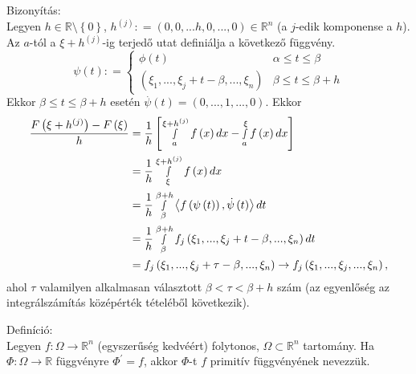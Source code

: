 \documentclass[12pt,a4paper]{scrartcl}
\newenvironment{definicio}{}{}
\newenvironment{bizonyitas}{}{}
\begin{document}
\begin{bizonyitas}

Bizonyítás:\\
Legyen \(h \in {\mathbb{R}}\text{\textbackslash}\left\{ 0 \right\}\),
\(h^{(j)}: = \left( {0,0,...h,0,...,0} \right) \in {\mathbb{R}}^{n}\) (a
\(j\)-edik komponense a \(h\)). Az \(a\)-tól a \(\xi + h^{(j)}\)-ig
terjedő utat definiálja a következő függvény.
\[\psi \left( t \right): = \left\{ {\begin{array}{*{20}{c}}
  {\phi \left( t \right)}&{\alpha  \leqslant t \leqslant \beta } \\ 
  {\left( {{\xi _1},...,{\xi _j} + t - \beta ,...,{\xi _n}} \right)}&{\beta  \leqslant t \leqslant \beta  + h} 
\end{array}} \right.\] Ekkor \(\beta \leq t \leq \beta + h\) esetén
\(\overset{.}{\psi}\left( t \right) = \left( 0,...,1,...,0 \right)\).
Ekkor \[\begin{aligned}
  \frac{{F\left( {\xi  + {h^{\left( j \right)}}} \right) - F\left( \xi  \right)}}{h} &  = \frac{1}{h}\left[ {\mathop \smallint \limits_a^{\xi  + {h^{\left( j \right)}}} f\left( x \right)dx - \mathop \smallint \limits_a^\xi  f\left( x \right)dx} \right] \\ 
   &  = \frac{1}{h}\mathop \smallint \limits_\xi ^{\xi  + {h^{\left( j \right)}}} f\left( x \right)dx \\ 
   &  = \frac{1}{h}\mathop \smallint \limits_\beta ^{\beta  + h} \left\langle {f\left( {\psi \left( t \right)} \right),\dot \psi \left( t \right)} \right\rangle dt \\ 
   &  = \frac{1}{h}\mathop \smallint \limits_\beta ^{\beta  + h} {f_j}\left( {{\xi _1},...,{\xi _j} + t - \beta ,...,{\xi _n}} \right)dt \\ 
   &  = {f_j}\left( {{\xi _1},...,{\xi _j} + \tau  - \beta ,...,{\xi _n}} \right) \to {f_j}\left( {{\xi _1},...,{\xi _j},...,{\xi _n}} \right), \\ 
\end{aligned} \] ahol \(\tau\) valamilyen alkalmasan választott
\(\beta < \tau < \beta + h\) szám (az egyenlőség az integrálszámítás
középérték tételéből következik).

\end{bizonyitas}

\begin{definicio}

Definíció:\\
Legyen \(\left. f:\Omega\rightarrow{\mathbb{R}}^{n} \right.\)
(egyszerűség kedvéért) folytonos, \(\Omega \subset {\mathbb{R}}^{n}\)
tartomány. Ha \(\left. \Phi:\Omega\rightarrow{\mathbb{R}} \right.\)
függvényre \(\Phi^{\prime} = f\), akkor \(\Phi\)-t \(f\) primitív
függvényének nevezzük.

\end{definicio}
\end{document}
